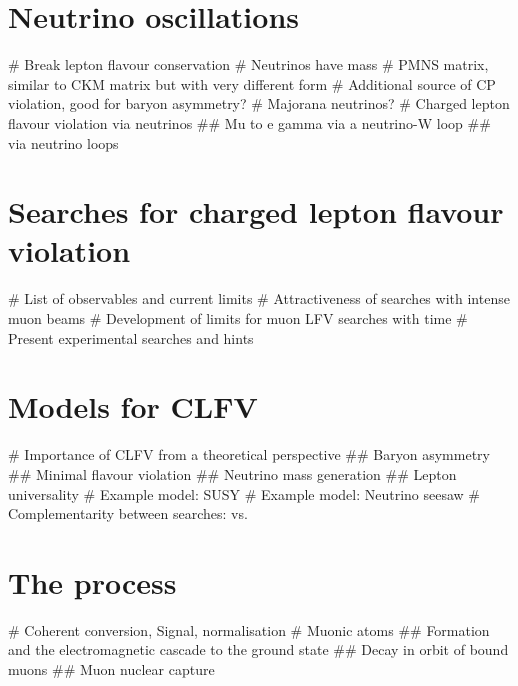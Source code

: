 \section{Neutrino oscillations}
\begin{easylist}
    # Break lepton flavour conservation
    # Neutrinos have mass
    # PMNS matrix, similar to CKM matrix but with very different form
    # Additional source of CP violation, good for baryon asymmetry?
    # Majorana neutrinos?
    # Charged lepton flavour violation via neutrinos
    ## Mu to e gamma via a neutrino-W loop
    ## \mueconv via neutrino loops
\end{easylist}
\section{Searches for charged lepton flavour violation}
\begin{easylist}
   # List of observables and current limits
   # Attractiveness of searches with intense muon beams
   # Development of limits for muon LFV searches with time
   # Present experimental searches and hints
\end{easylist}
\section{Models for CLFV}
\begin{easylist}
    # Importance of CLFV from a theoretical perspective
    ## Baryon asymmetry
    ## Minimal flavour violation
    ## Neutrino mass generation
    ## Lepton universality
    # Example model: SUSY
    # Example model: Neutrino seesaw
    # Complementarity between searches: \mueconv vs. \muegamma
\end{easylist}
\section{The \mueconv process}
\begin{easylist}
  # Coherent conversion, Signal, normalisation
  # Muonic atoms
  ## Formation and the electromagnetic cascade to the ground state
  ## Decay in orbit of bound muons
  ## Muon nuclear capture
\end{easylist}
